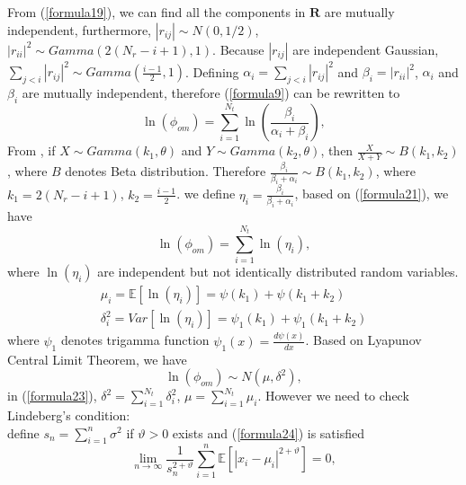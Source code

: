 \documentclass[12pt,letter,final]{article}
\begin{document}
\begin{spacing}{2.5}
From (\ref{formula19}), we can find all the components in $\mathbf{R}$ are mutually independent, furthermore, $|r_{ij}|\sim N(0,1/2)$, $|r_{ii}|^{2}\sim Gamma(2(N_{r}-i+1),1)$. Because $|r_{ij}|$ are independent Gaussian, $\sum_{j<i}|r_{ij}|^{2}\sim Gamma(\frac{i-1}{2}, 1)$. Defining $\alpha_{i}=\sum_{j<i}|r_{ij}|^{2}$ and $\beta_{i}=|r_{ii}|^{2}$, $\alpha_{i}$ and $\beta_{i}$ are mutually independent, therefore (\ref{formula9}) can be rewritten to 
\begin{equation}
\ln(\phi_{om})=\sum_{i=1}^{N_{t}}\ln(\frac{\beta_{i}}{\alpha_{i}+\beta_{i}}),
\label{formula21}
\end{equation}
From \cite{gupta2004handbook}, if $X\sim Gamma(k_{1},\theta)$ and $Y\sim Gamma(k_{2},\theta)$, then $\frac{X}{X+Y}\sim B(k_{1},k_{2})$, where $B$ denotes Beta distribution. Therefore $\frac{\beta_{i}}{\beta_{i}+\alpha_{i}}\sim B(k_{1}, k_{2})$, where $k_{1}=2(N_{r}-i+1)$, $k_{2}=\frac{i-1}{2}$. we define $\eta_{i}=\frac{\beta_{i}}{\beta_{i}+\alpha_{i}}$, based on (\ref{formula21}), we have 
\begin{equation}
\ln(\phi_{om})=\sum_{i=1}^{N_{t}}\ln(\eta_{i}),
\label{formula22}
\end{equation}
where $\ln(\eta_{i})$ are independent but not identically distributed random variables.
\begin{eqnarray}
\mu_{i}=\mathbb{E}[\ln(\eta_{i})]=\psi(k_{1})+\psi(k_{1}+k_{2})\\
\delta_{i}^{2}=Var[\ln(\eta_{i})]=\psi_{1}(k_{1})+\psi_{1}(k_{1}+k_{2})
\end{eqnarray}
where $\psi_{1}$ denotes trigamma function $\psi_{1}(x)=\frac{d\psi(x)}{dx}$.
Based on Lyapunov Central Limit Theorem\cite{jacod1987limit}, we have 
\begin{equation}
\ln(\phi_{om})\sim N(\mu,\delta^{2}),
\label{formula23}
\end{equation}
in (\ref{formula23}), $\delta^{2}=\sum_{i=1}^{N_{t}}\delta_{i}^{2}$, $\mu=\sum_{i=1}^{N_{t}}\mu_{i}$. However we need to check Lindeberg's condition: \\
define $s_{n}=\sum_{i=1}^{n}\sigma^{2}$ if $\vartheta>0$ exists and (\ref{formula24}) is satisfied
\begin{equation}
\lim_{n\to \infty}\frac{1}{s_{n}^{2+\vartheta}}\sum_{i=1}^{n}\mathbb{E}[|x_{i}-\mu_{i}|^{2+\vartheta}]=0,
\label{formula24}
\end{equation}


\end{spacing}
\end{document}
